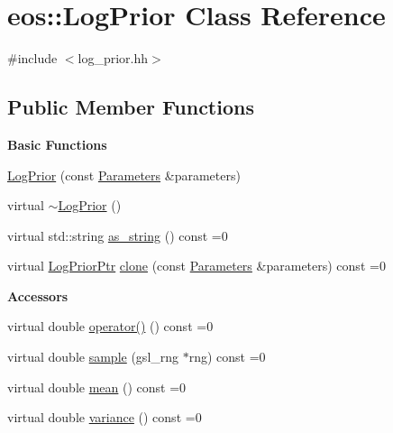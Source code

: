 \hypertarget{classeos_1_1LogPrior}{
\section{eos::LogPrior Class Reference}
\label{classeos_1_1LogPrior}
}


{\ttfamily \#include $<$log\_\-prior.hh$>$}\subsection*{Public Member Functions}
\begin{Indent}{\bf Basic Functions}\par
{\em \label{_amgrp2386c9a1f1785edee33f374dd2db9b3d}
 }\begin{DoxyCompactItemize}
\item 
\hyperlink{classeos_1_1LogPrior_ae06bbf3b7073084d135bedd818fbf988}{LogPrior} (const \hyperlink{classeos_1_1Parameters}{Parameters} \&parameters)
\item 
virtual \hyperlink{classeos_1_1LogPrior_affbfcbe3bf1a16aa5e696880d20e2822}{$\sim$LogPrior} ()
\item 
virtual std::string \hyperlink{classeos_1_1LogPrior_a3c6fe4377cbfdf51bf1472ef16272660}{as\_\-string} () const =0
\item 
virtual \hyperlink{namespaceeos_ac5481e3b46ee55ff24606ee7f6e78651}{LogPriorPtr} \hyperlink{classeos_1_1LogPrior_abb48bbbc8034fc487403fee22265f2c8}{clone} (const \hyperlink{classeos_1_1Parameters}{Parameters} \&parameters) const =0
\end{DoxyCompactItemize}
\end{Indent}
\begin{Indent}{\bf Accessors}\par
{\em \label{_amgrp04cb611d2bf0c8edd5b113799b30e174}
 }\begin{DoxyCompactItemize}
\item 
virtual double \hyperlink{classeos_1_1LogPrior_ac686393e071443d706a104093957e667}{operator()} () const =0
\item 
virtual double \hyperlink{classeos_1_1LogPrior_a9bbc9805dcb6abbe6d16efff44b43ea3}{sample} (gsl\_\-rng $\ast$rng) const =0
\item 
virtual double \hyperlink{classeos_1_1LogPrior_afb69583b9532799aa6068d8f4bc3781a}{mean} () const =0
\item 
virtual double \hyperlink{classeos_1_1LogPrior_a525c7cd21ac2f4f273893d8740ca9136}{variance} () const =0
\end{DoxyCompactItemize}
\end{Indent}
